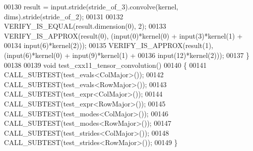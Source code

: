 \begin{DoxyCode}
00130   result = input.stride(stride\_of\_3).convolve(kernel, dims).stride(stride\_of\_2);
00131 
00132   VERIFY\_IS\_EQUAL(result.dimension(0), 2);
00133   VERIFY\_IS\_APPROX(result(0), (input(0)*kernel(0) + input(3)*kernel(1) +
00134                                input(6)*kernel(2)));
00135   VERIFY\_IS\_APPROX(result(1), (input(6)*kernel(0) + input(9)*kernel(1) +
00136                                input(12)*kernel(2)));
00137 \}
00138 
00139 \textcolor{keywordtype}{void} test\_cxx11\_tensor\_convolution()
00140 \{
00141   CALL\_SUBTEST(test\_evals<ColMajor>());
00142   CALL\_SUBTEST(test\_evals<RowMajor>());
00143   CALL\_SUBTEST(test\_expr<ColMajor>());
00144   CALL\_SUBTEST(test\_expr<RowMajor>());
00145   CALL\_SUBTEST(test\_modes<ColMajor>());
00146   CALL\_SUBTEST(test\_modes<RowMajor>());
00147   CALL\_SUBTEST(test\_strides<ColMajor>());
00148   CALL\_SUBTEST(test\_strides<RowMajor>());
00149 \}
\end{DoxyCode}
